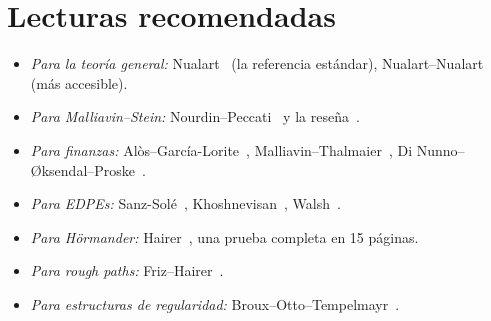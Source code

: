 \section{Lecturas recomendadas}
\begin{itemize}
  \item \emph{Para la teoría general:} Nualart~\cite{Nualart06} (la referencia estándar), Nualart--Nualart~\cite{NualartNualart18} (más
  accesible).
  \item \emph{Para Malliavin--Stein:} Nourdin--Peccati~\cite{NourdinPeccati12} y la reseña~\cite{AzmoodehPeccatiYang21}.
  \item \emph{Para finanzas:} Alòs--García-Lorite~\cite{AlosGarciaLorite21}, Malliavin--Thalmaier~\cite{MalliavinThalmaier06}, Di Nunno--Øksendal--Proske~\cite{DiNunnoOksendalProske09}.
  \item \emph{Para EDPEs:} Sanz-Solé~\cite{SanzSole05}, Khoshnevisan~\cite{Khoshnevisan14}, Walsh~\cite{Walsh86}.
  \item \emph{Para Hörmander:} Hairer~\cite{Hairer11}, una prueba completa en 15 páginas.
  \item \emph{Para rough paths:} Friz--Hairer~\cite{FrizHairer20}.
  \item \emph{Para estructuras de regularidad:} Broux--Otto--Tempelmayr~\cite{BrouxOttoTempelmayr25}.
\end{itemize}
